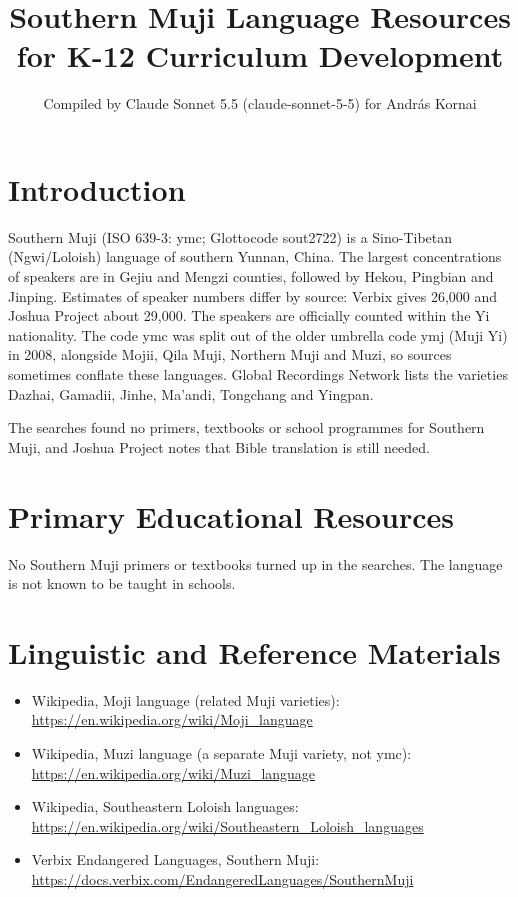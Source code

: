 \documentclass[12pt]{article}
\title{Southern Muji Language Resources for K-12 Curriculum Development}
\author{Compiled by Claude Sonnet 5.5 (claude-sonnet-5-5) for Andr\'as Kornai}
\date{}
\begin{document}
\maketitle

\section{Introduction}
Southern Muji (ISO 639-3: ymc; Glottocode sout2722) is a Sino-Tibetan (Ngwi/Loloish) language of southern Yunnan, China. The largest concentrations of speakers are in Gejiu and Mengzi counties, followed by Hekou, Pingbian and Jinping. Estimates of speaker numbers differ by source: Verbix gives 26,000 and Joshua Project about 29,000. The speakers are officially counted within the Yi nationality. The code ymc was split out of the older umbrella code ymj (Muji Yi) in 2008, alongside Mojii, Qila Muji, Northern Muji and Muzi, so sources sometimes conflate these languages. Global Recordings Network lists the varieties Dazhai, Gamadii, Jinhe, Ma'andi, Tongchang and Yingpan.

The searches found no primers, textbooks or school programmes for Southern Muji, and Joshua Project notes that Bible translation is still needed.

\section{Primary Educational Resources}
No Southern Muji primers or textbooks turned up in the searches. The language is not known to be taught in schools.

\section{Linguistic and Reference Materials}
\begin{itemize}
\item Wikipedia, Moji language (related Muji varieties): \url{https://en.wikipedia.org/wiki/Moji_language}
\item Wikipedia, Muzi language (a separate Muji variety, not ymc): \url{https://en.wikipedia.org/wiki/Muzi_language}
\item Wikipedia, Southeastern Loloish languages: \url{https://en.wikipedia.org/wiki/Southeastern_Loloish_languages}
\item Verbix Endangered Languages, Southern Muji: \url{https://docs.verbix.com/EndangeredLanguages/SouthernMuji}
\end{itemize}
\end{document}
